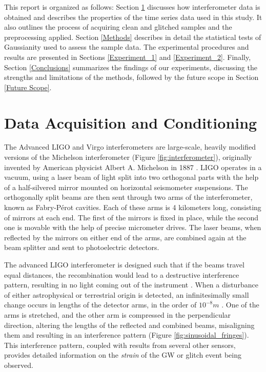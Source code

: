 \documentclass[12pt]{article}
\begin{document}
\medskip
\noindent This report is organized as follows: Section \ref{Data} discusses how interferometer data is obtained and describes the properties of the time series data used in this study. It also outlines the process of acquiring clean and glitched samples and the preprocessing applied. Section \ref{Methods} describes in detail the statistical tests of Gaussianity used to assess the sample data. The experimental procedures and results are presented in Sections \ref{Experiment_1} and \ref{Experiment_2}. Finally, Section \ref{Conclusions} summarizes the findings of our experiments, discussing the strengths and limitations of the methods, followed by the future scope in Section \ref{Future Scope}.

\pagebreak

\section{Data Acquisition and Conditioning}\label{Data}

\medskip
\noindent The Advanced LIGO and Virgo interferometers are large-scale, heavily modified versions of the Michelson interferometer (Figure \ref{fig:interferometer}), originally invented by American physicist Albert A. Michelson in 1887 \cite{weiss_report_1972,collaboration_gwtc-3_2023}. LIGO operates in a vacuum, using a laser beam of light split into two orthogonal parts with the help of a half-silvered mirror mounted on horizontal seismometer suspensions. The orthogonally split beams are then sent through two arms of the interferometer, known as Fabry-Pérot cavities. Each of these arms is 4 kilometers long, consisting of mirrors at each end. The first of the mirrors is fixed in place, while the second one is movable with the help of precise micrometer drives. The laser beams, when reflected by the mirrors on either end of the arms, are combined again at the beam splitter and sent to photoelectric detectors.

\medskip
\noindent The advanced LIGO interferometer is designed such that if the beams travel equal distances, the recombination would lead to a destructive interference pattern, resulting in no light coming out of the instrument \cite{ligo_what_interferometer}. When a disturbance of either astrophysical or terrestrial origin is detected, an infinitesimally small change occurs in lengths of the detector arms, in the order of $10^{-8}m$ \cite{ghonge_assessing_2024}. One of the arms is stretched, and the other arm is compressed in the perpendicular direction, altering the lengths of the reflected and combined beams, misaligning them and resulting in an interference pattern (Figure \ref{fig:sinusoidal_fringes}). This interference pattern, coupled with results from several other sensors, provides detailed information on the \textit{strain} of the GW or glitch event being observed.
\end{document}
